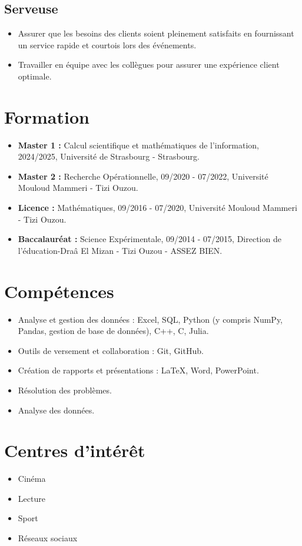 \documentclass[a4paper,10pt]{article}
\begin{document}
\subsection*{Serveuse}
\begin{itemize}[leftmargin=*]
    \item Assurer que les besoins des clients soient pleinement satisfaits en fournissant un service rapide et courtois lors des événements.
    \item Travailler en équipe avec les collègues pour assurer une expérience client optimale.
\end{itemize}

\section*{Formation}
\begin{itemize}[leftmargin=*]
    \item \textbf{Master 1 :} Calcul scientifique et mathématiques de l'information, 2024/2025, Université de Strasbourg - Strasbourg.
    \item \textbf{Master 2 :} Recherche Opérationnelle, 09/2020 - 07/2022, Université Mouloud Mammeri - Tizi Ouzou.
    \item \textbf{Licence :} Mathématiques, 09/2016 - 07/2020, Université Mouloud Mammeri - Tizi Ouzou.
    \item \textbf{Baccalauréat :} Science Expérimentale, 09/2014 - 07/2015, Direction de l'éducation-Draâ El Mizan - Tizi Ouzou - ASSEZ BIEN.
\end{itemize}

\section*{Compétences}
\begin{itemize}[leftmargin=*]
    \item Analyse et gestion des données : Excel, SQL, Python (y compris NumPy, Pandas, gestion de base de données), C++, C, Julia.
    \item Outils de versement et collaboration : Git, GitHub.
    \item Création de rapports et présentations : LaTeX, Word, PowerPoint.
    \item Résolution des problèmes.
    \item Analyse des données.
\end{itemize}

\section*{Centres d'intérêt}
\begin{itemize}[leftmargin=*]
    \item Cinéma
    \item Lecture
    \item Sport
    \item Réseaux sociaux
\end{itemize}
\end{document}

